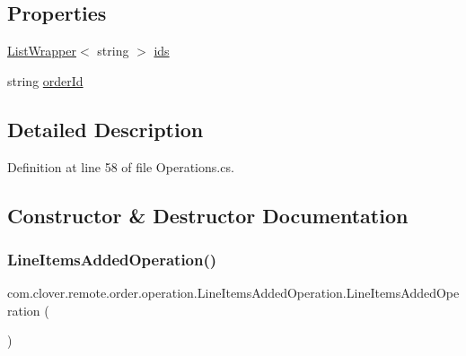 \subsection*{Properties}
\begin{DoxyCompactItemize}
\item 
\hyperlink{classcom_1_1clover_1_1remote_1_1order_1_1_list_wrapper}{List\+Wrapper}$<$ string $>$ \hyperlink{classcom_1_1clover_1_1remote_1_1order_1_1operation_1_1_line_items_added_operation_a778abf91769027cdfd6c3c9621de5b3a}{ids}
\item 
string \hyperlink{classcom_1_1clover_1_1remote_1_1order_1_1operation_1_1_line_items_added_operation_a3d210c422f722cef34c52d606a01d6f0}{order\+Id}
\end{DoxyCompactItemize}


\subsection{Detailed Description}


Definition at line 58 of file Operations.\+cs.



\subsection{Constructor \& Destructor Documentation}
\mbox{\label{classcom_1_1clover_1_1remote_1_1order_1_1operation_1_1_line_items_added_operation_a9c5c992ab4220b18f4a0beda23cf43b4}} 
\subsubsection{\texorpdfstring{Line\+Items\+Added\+Operation()}{LineItemsAddedOperation()}\hspace{0.1cm}{\footnotesize\ttfamily [1/2]}}
{\footnotesize\ttfamily com.\+clover.\+remote.\+order.\+operation.\+Line\+Items\+Added\+Operation.\+Line\+Items\+Added\+Operation (\begin{DoxyParamCaption}{ }\end{DoxyParamCaption})}



